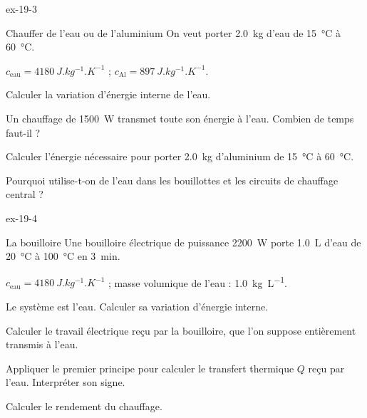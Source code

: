 \begin{blocLivre}{ex-19-3}
\begin{exercice}[1]{Chauffer de l'eau ou de l'aluminium}
On veut porter \qty{2,0}{kg} d'eau de \qty{15}{\degreeCelsius} à \qty{60}{\degreeCelsius}.
\begin{donnees}
$c_\mathrm{eau}=\qty{4180}{J.kg^{-1}.K^{-1}}$ ; $c_\mathrm{Al}=\qty{897}{J.kg^{-1}.K^{-1}}$.
\end{donnees}
\begin{questions}
\item Calculer la variation d'énergie interne de l'eau.
\item Un chauffage de \qty{1500}{W} transmet toute son énergie à l'eau. Combien de temps faut-il ?
\item Calculer l'énergie nécessaire pour porter \qty{2,0}{kg} d'aluminium de \qty{15}{\degreeCelsius} à \qty{60}{\degreeCelsius}.
\item Pourquoi utilise-t-on de l'eau dans les bouillottes et les circuits de chauffage central ?
\end{questions}
\end{exercice}
\end{blocLivre}
\begin{blocLivre}{ex-19-4}
\begin{exercice}[1]{La bouilloire}
Une bouilloire électrique de puissance \qty{2200}{W} porte \qty{1,0}{L} d'eau de \qty{20}{\degreeCelsius} à \qty{100}{\degreeCelsius}
en \qty{3}{min}.
\begin{donnees}
$c_\mathrm{eau}=\qty{4180}{J.kg^{-1}.K^{-1}}$ ; masse volumique de l'eau : \qty{1,0}{kg.L^{-1}}.
\end{donnees}
\begin{questions}
\item Le système est l'eau. Calculer sa variation d'énergie interne.
\item Calculer le travail électrique reçu par la bouilloire, que l'on suppose entièrement transmis à l'eau.
\item Appliquer le premier principe pour calculer le transfert thermique $Q$ reçu par l'eau. Interpréter son signe.
\item Calculer le rendement du chauffage.
\end{questions}
\end{exercice}
\end{blocLivre}
